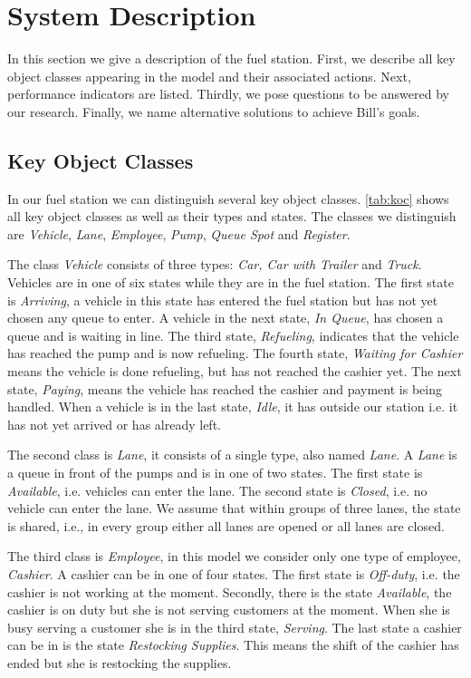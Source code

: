\section{System Description}
In this section we give a description of the fuel station.
First, we describe all key object classes appearing in the model and their associated actions.
Next, performance indicators are listed.
Thirdly, we pose questions to be answered by our research.
Finally, we name alternative solutions to achieve Bill's goals.

\subsection{Key Object Classes}
In our fuel station we can distinguish several key object classes.
\autoref{tab:koc} shows all key object classes as well as their types and states.
The classes we distinguish are \textit{Vehicle}, \textit{Lane}, \textit{Employee}, \textit{Pump}, \textit{Queue Spot} and \textit{Register}.

The class \textit{Vehicle} consists of three types: \textit{Car, Car with Trailer} and \textit{Truck}.
 Vehicles are in one of six states while they are in the fuel station.
 The first state is \textit{Arriving}, a vehicle in this state has entered the fuel station but has not yet chosen any queue to enter.
 A vehicle in the next state, \textit{In Queue}, has chosen a queue and is waiting in line.
 The third state, \textit{Refueling}, indicates that the vehicle has reached the pump and is now refueling.
 The fourth state, \textit{Waiting for Cashier} means the vehicle is done refueling, but has not reached the cashier yet.
 The next state, \textit{Paying}, means the vehicle has reached the cashier and payment is being handled.
 When a vehicle is in the last state, \textit{Idle}, it has outside our station i.e. it has not yet arrived or has already left.

The second class is \textit{Lane}, it consists of a single type, also named \textit{Lane}.
A \textit{Lane} is a queue in front of the pumps and is in one of two states.
The first state is \textit{Available}, i.e. vehicles can enter the lane.
The second state is \textit{Closed}, i.e. no vehicle can enter the lane.
We assume that within groups of three lanes, the state is shared, i.e., in every group either all lanes are opened or all lanes are closed.

The third class is \textit{Employee}, in this model we consider only one type of employee, \textit{Cashier}.
A cashier can be in one of four states.
The first state is \textit{Off-duty}, i.e. the cashier is not working at the moment.
Secondly, there is the state \textit{Available}, the cashier is on duty but she is not serving customers at the moment.
When she is busy serving a customer she is in the third state, \textit{Serving}.
The last state a cashier can be in is the state \textit{Restocking Supplies}.
This means the shift of the cashier has ended but she is restocking the supplies.


